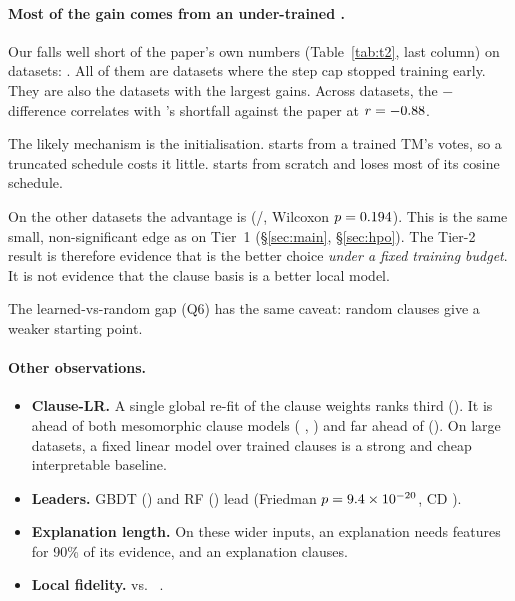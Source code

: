 \paragraph{Most of the gain comes from an under-trained \imn{}.} Our \imn{} falls well short
of the paper's own numbers (Table~\ref{tab:t2}, last column) on \TiertwoShortN{} datasets:
\TiertwoShortList. All \TiertwoShortCapped{} of them are datasets where the step cap stopped
training early. They are also the datasets with the largest  gains. Across
datasets, the $-$\imn{} difference correlates with \imn{}'s shortfall against the
paper at $r=-0.88$.

The likely mechanism is the initialisation.  starts from a trained TM's votes, so
a truncated schedule costs it little. \imn{} starts from scratch and loses most of its cosine
schedule.

On the other \TiertwoRestN{} datasets the advantage is \TiertwoRestMean{}
(\TiertwoRestWins/\TiertwoRestLosses, Wilcoxon $p=0.194$). This is the same
small, non-significant edge as on Tier~1 (\S\ref{sec:main}, \S\ref{sec:hpo}). The Tier-2
result is therefore evidence that  is the better choice \emph{under a fixed
training budget}. It is not evidence that the clause basis is a better local model.

The learned-vs-random gap (Q6) has the same caveat: random clauses give a weaker starting
point.

\paragraph{Other observations.}
\begin{itemize}
  \item \textbf{Clause-LR.} A single global re-fit of the clause weights ranks third
        (\TiertwoRankclauselr). It is ahead of both mesomorphic clause models
        ( \TiertwoRankimnhybrid,  \TiertwoRankimntm) and far ahead
        of \imn{} (\TiertwoRankimn). On large datasets, a fixed linear model over trained
        clauses is a strong and cheap interpretable baseline.
  \item \textbf{Leaders.} GBDT (\TiertwoRankgbdt) and RF (\TiertwoRankrf) lead (Friedman
        $p=9.4\times 10^{-20}$, CD \TiertwoCD).
  \item \textbf{Explanation length.} On these wider inputs, an \imn{} explanation needs
        \TiertwoLinimn{} features for 90\% of its evidence, and an  explanation
        \TiertwoClausesimntm{} clauses.
  \item \textbf{Local fidelity.}  \TiertwoFidimntm{} vs.\ \imn{} \TiertwoFidimn.
\end{itemize}
